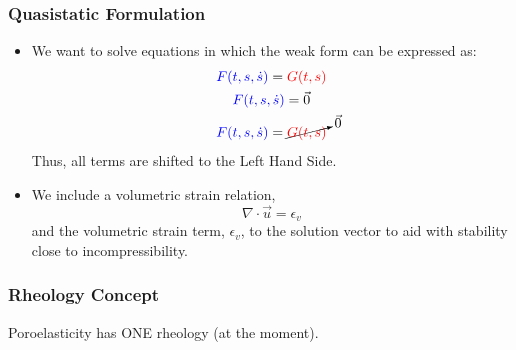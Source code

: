 \documentclass[aspectratio=169,hyperref=colorlinks]{beamer}
\begin{document}
\begin{frame}
  \frametitle{Quasistatic Formulation}
  \begin{itemize}
    \item   We want to solve equations in which the weak form can be expressed
  as:
    \begin{gather*}
      {\color{blue}F(t,s,\dot{s})} = {\color{red}G(t,s)} \\
      {\color{blue}F(t,s,\dot{s})} = \vec{0} \\
      {\color{blue}F(t,s,\dot{s})} = \cancelto{\vec{0}}{{\color{red}G(t,s)}}
    \end{gather*} 
    Thus, all terms are shifted to the Left Hand Side.
    \item We include a volumetric strain relation,
    \begin{equation*}
      \nabla \cdot \vec{u} = \epsilon_{v}
    \end{equation*}
    and the volumetric strain term, $\epsilon_{v}$, to the solution vector to 
    aid with stability close to incompressibility.
  \end{itemize}
\end{frame}

\begin{frame}
  \frametitle{Rheology Concept}
  
    \begin{table}[htbp]
    \end{table}
    Poroelasticity has ONE rheology (at the moment).
\end{frame}
\end{document}
